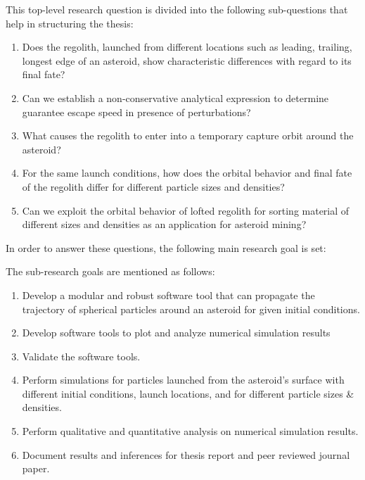 \vspace{5mm}
This top-level research question is divided into the following sub-questions that help in structuring the thesis:
\begin{enumerate}
\item Does the regolith, launched from different locations such as leading, trailing, longest edge of an asteroid, show characteristic differences with regard to its final fate?
\item Can we establish a non-conservative analytical expression to determine guarantee escape speed in presence of perturbations?
\item What causes the regolith to enter into a temporary capture orbit around the asteroid?
\item For the same launch conditions, how does the orbital behavior and final fate of the regolith differ for different particle sizes and densities?
\item Can we exploit the orbital behavior of lofted regolith for sorting material of different sizes and densities as an application for asteroid mining?
\end{enumerate}
\vspace{5mm}
In order to answer these questions, the following main research goal is set:
\begin{center}
\end{center}
The sub-research goals are mentioned as follows:
\begin{enumerate}
\item Develop a modular and robust software tool that can propagate the trajectory of spherical particles around an asteroid for given initial conditions.
\item Develop software tools to plot and analyze numerical simulation results
\item Validate the software tools.
\item Perform simulations for particles launched from the asteroid's surface with different initial conditions, launch locations, and for different particle sizes \& densities.
\item Perform qualitative and quantitative analysis on numerical simulation results.
\item Document results and inferences for thesis report and peer reviewed journal paper.
\end{enumerate}
